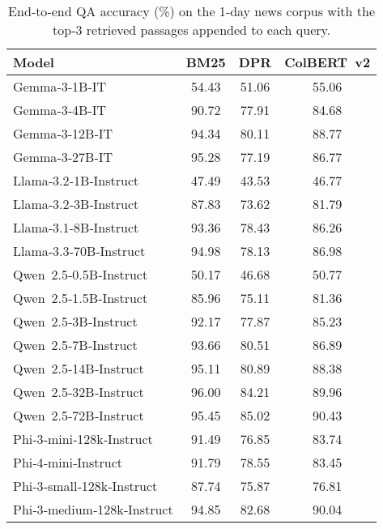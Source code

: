 \documentclass[11pt]{article}
\begin{document}
\begin{table*}[t]
\centering
\small
\setlength{\tabcolsep}{6pt}
\caption{End‑to‑end QA accuracy (\%) on the 1‑day news corpus
with the top‑3 retrieved passages appended to each query.}
\label{tab:retrieval-qa-accuracy_1}
\begin{tabular}{lccc}
\toprule
\textbf{Model} & \textbf{BM25} & \textbf{DPR} & \textbf{ColBERT v2} \\
\midrule
Gemma‑3‑1B‑IT            & 54.43 & 51.06 & 55.06 \\
Gemma‑3‑4B‑IT            & 90.72 & 77.91 & 84.68 \\
Gemma‑3‑12B‑IT           & 94.34 & 80.11 & 88.77 \\
Gemma‑3‑27B‑IT           & 95.28 & 77.19 & 86.77 \\[2pt]
Llama‑3.2‑1B‑Instruct    & 47.49 & 43.53 & 46.77 \\
Llama‑3.2‑3B‑Instruct    & 87.83 & 73.62 & 81.79 \\
Llama‑3.1‑8B‑Instruct    & 93.36 & 78.43 & 86.26 \\
Llama‑3.3‑70B‑Instruct   & 94.98 & 78.13 & 86.98 \\[2pt]
Qwen 2.5‑0.5B‑Instruct   & 50.17 & 46.68 & 50.77 \\
Qwen 2.5‑1.5B‑Instruct   & 85.96 & 75.11 & 81.36 \\
Qwen 2.5‑3B‑Instruct     & 92.17 & 77.87 & 85.23 \\
Qwen 2.5‑7B‑Instruct     & 93.66 & 80.51 & 86.89 \\
Qwen 2.5‑14B‑Instruct    & 95.11 & 80.89 & 88.38 \\
Qwen 2.5‑32B‑Instruct    & 96.00 & 84.21 & 89.96 \\
Qwen 2.5‑72B‑Instruct    & 95.45 & 85.02 & 90.43 \\[2pt]
Phi‑3‑mini‑128k‑Instruct & 91.49 & 76.85 & 83.74 \\
Phi‑4‑mini‑Instruct      & 91.79 & 78.55 & 83.45 \\
Phi‑3‑small‑128k‑Instruct& 87.74 & 75.87 & 76.81 \\
Phi‑3‑medium‑128k‑Instruct& 94.85& 82.68 & 90.04 \\
\bottomrule
\end{tabular}
\end{table*}
\end{document}
